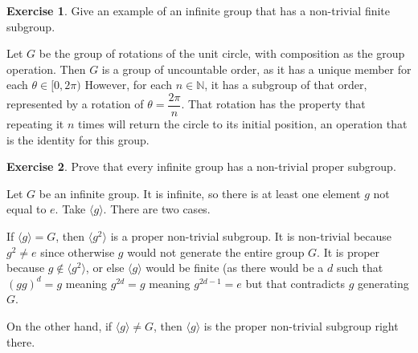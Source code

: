 \documentclass[11pt,oneside]{article}
\numberwithin{equation}{section}
\theoremstyle{definition}
\newtheorem{exercise}{Exercise}
\def\NN{\mathbb{N}}
\begin{document}
\begin{exercise}
  Give an example of an infinite group that has a non-trivial finite subgroup.  
\end{exercise}

\begin{solution}
  Let $G$ be the group of rotations of the unit circle, with
  composition as the group operation.  Then $G$ is a group of
  uncountable order, as it has a unique member for each $ \theta \in [
    0, 2 \pi ) $ However, for each $ n \in \NN$, it has a
    subgroup of that order, represented by a rotation of $ \theta = \dfrac{2 \pi}{n}$.
    That rotation has the property that repeating
    it $n$ times will return the circle to its initial position, an
    operation that is the identity for this group.
\end{solution}

\begin{exercise}
  Prove that every infinite group has a non-trivial proper subgroup.
\end{exercise}

\begin{solution}
  Let $G$ be an infinite group.  It is infinite, so there is at least
  one element $g$ not equal to $e$.  Take $ \langle g \rangle$.  There
  are two cases.

  If $ \langle g \rangle = G $, then $ \langle g ^ 2 \rangle $
  is a proper non-trivial subgroup.  It is non-trivial
  because $g ^2 \neq e$ since otherwise $g$ would not generate the
  entire group $G$.  It is proper because $ g \notin \langle g ^ 2 \rangle $,
  or else $ \langle g \rangle $ would be finite (as there would be
  a $d$ such that $ ( g g) ^ d = g$ meaning $ g ^ {2 d} = g$ meaning $
  g ^ { 2d - 1 } = e $ but that contradicts $g$ generating $G$.

  On the other hand, if $ \langle g \rangle \neq G$, then $ \langle g \rangle $ is the
  proper non-trivial subgroup right there.  
  

\end{solution}

\begin{comment}
\begin{exercise}
  problem
\end{exercise}
\begin{solution}
\begin{enumerate}[(a)]
\item
  first answer
\end{enumerate}
\end{solution}
\end{comment}
\end{document}
